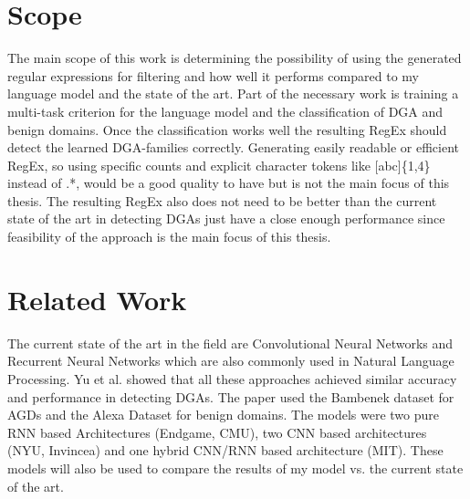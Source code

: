 \documentclass[a4paper, 12pt]{article}
\begin{document}
\section{Scope}
The main scope of this work is determining the possibility of using the generated regular
expressions for filtering and how well it performs compared to my language model and the state of the art.
Part of the necessary work is training a multi-task criterion for the language model and the
classification of DGA and benign domains. 
Once the classification works well the resulting RegEx should detect the learned DGA-families
correctly. Generating easily readable or efficient RegEx, so using specific counts and explicit
character tokens like [abc]\{1,4\} instead of .*, would be a good quality to have but is not
the main focus of this thesis. 
The resulting RegEx also does not need to be better than the current state of the art in detecting
DGAs just have a close enough performance since feasibility of the approach is the main focus of
this thesis.

\section{Related Work}
The current state of the art in the field are Convolutional Neural Networks and Recurrent Neural
Networks which are also commonly used in Natural Language Processing. Yu et al.
\cite{yu_character_2018} showed that all these approaches achieved similar accuracy and performance
in detecting DGAs.  The paper used the Bambenek dataset for AGDs and the Alexa Dataset for benign
domains. The models were two pure RNN based Architectures (Endgame, CMU), two CNN based
architectures (NYU, Invincea) and one hybrid CNN/RNN based architecture (MIT). 
These models will also be used to compare the results of my model vs. the current state of the art.

\clearpage

\printbibliography
\end{document}
